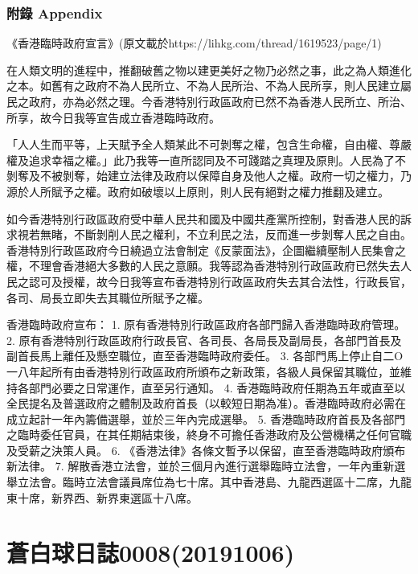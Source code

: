 \documentclass[a5paper, 12pt
]{book}
\begin{document}
\hypertarget{ux9644ux9304-appendix}{%
\subsubsection{附錄 Appendix}\label{ux9644ux9304-appendix}}

《香港臨時政府宣言》(原文載於https://lihkg.com/thread/1619523/page/1)

在人類文明的進程中，推翻破舊之物以建更美好之物乃必然之事，此之為人類進化之本。如舊有之政府不為人民所立、不為人民所治、不為人民所享，則人民建立屬民之政府，亦為必然之理。今香港特別行政區政府已然不為香港人民所立、所治、所享，故今日我等宣告成立香港臨時政府。

「人人生而平等，上天賦予全人類某此不可剝奪之權，包含生命權，自由權、尊嚴權及追求幸福之權。」此乃我等一直所認同及不可踐踏之真理及原則。人民為了不剝奪及不被剝奪，始建立法律及政府以保障自身及他人之權。政府一切之權力，乃源於人所賦予之權。政府如破壞以上原則，則人民有絕對之權力推翻及建立。

如今香港特別行政區政府受中華人民共和國及中國共產黨所控制，對香港人民的訴求視若無睹，不斷剝削人民之權利，不立利民之法，反而進一步剝奪人民之自由。香港特別行政區政府今日繞過立法會制定《反蒙面法》，企圖繼續壓制人民集會之權，不理會香港絕大多數的人民之意願。我等認為香港特別行政區政府已然失去人民之認可及授權，故今日我等宣布香港特別行政區政府失去其合法性，行政長官，各司、局長立即失去其職位所賦予之權。

香港臨時政府宣布： 1. 原有香港特別行政區政府各部門歸入香港臨時政府管理。
2.
原有香港特別行政區政府行政長官、各司長、各局長及副局長，各部門首長及副首長馬上離任及懸空職位，直至香港臨時政府委任。
3.
各部門馬上停止自二O一八年起所有由香港特別行政區政府所頒布之新政策，各級人員保留其職位，並維持各部門必要之日常運作，直至另行通知。
4.
香港臨時政府任期為五年或直至以全民提名及普選政府之體制及政府首長（以較短日期為准）。香港臨時政府必需在成立起計一年內籌備選舉，並於三年內完成選舉。
5.
香港臨時政府首長及各部門之臨時委任官員，在其任期結束後，終身不可擔任香港政府及公營機構之任何官職及受薪之決策人員。
6. 《香港法律》各條文暫予以保留，直至香港臨時政府頒布新法律。 7.
解散香港立法會，並於三個月內進行選舉臨時立法會，一年內重新選舉立法會。臨時立法會議員席位為七十席。其中香港島、九龍西選區十二席，九龍東十席，新界西、新界東選區十八席。

\hypertarget{ux84bcux767dux7403ux65e5ux8a8c000820191006}{%
\section{蒼白球日誌0008(20191006)}\label{ux84bcux767dux7403ux65e5ux8a8c000820191006}}
\end{document}
